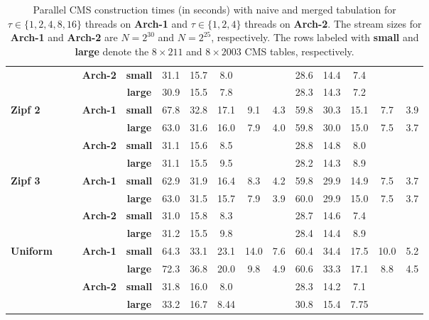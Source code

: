 \documentclass[10pt, conference, compsocconf]{IEEEtran}
\begin{document}
\begin{table}[htbp]
{\begin{tabular}{ccccc||ccccc|ccccc}
&&&\multirow{2}{*}{\textbf{Arch-2}} & \textbf{small}  & 31.1    & 15.7   & 8.0   &        &       &  28.6    &  14.4   & 7.4   &        &       \\
&&&& \textbf{large} &  30.9      &   15.5     &      7.8 &        &       &     28.3    &     14.3    &     7.2   &        &   \\ \hline   
\multicolumn{1}{l}{\multirow{4}{*}{\textbf{Zipf 2}}}
&&&\multirow{2}{*}{\textbf{Arch-1}} & \textbf{small}  & 67.8    & 32.8   & 17.1   & 9.1   & 4.3   & 59.8    & 30.3    & 15.1   & 7.7   & 3.9   \\
&&&& \textbf{large} & 63.0    & 31.6   & 16.0   &  7.9 & 4.0   &  59.8 &	30.0&	15.0	& 7.5	& 3.7 \\ \cline{2-15}

&&&\multirow{2}{*}{\textbf{Arch-2}} & \textbf{small}  & 31.1    & 15.6   & 8.5   &        &       &  28.8    &  14.8   & 8.0   &        &       \\
&&&& \textbf{large} &  31.1      &   15.5     &   9.5 &        &       &     28.2    &     14.3    &     8.9   &        &   \\ \hline
\multicolumn{1}{l}{\multirow{4}{*}{\textbf{Zipf 3}}}
&&&\multirow{2}{*}{\textbf{Arch-1}} & \textbf{small}  & 62.9    & 31.9   & 16.4   & 8.3   & 4.2   & 59.8    & 29.9    & 14.9   & 7.5   & 3.7   \\
&&&& \textbf{large} & 63.0    & 31.5   & 15.7   &  7.9 & 3.9   &  60.0 &	29.9&	15.0	& 7.5	& 3.7 \\ \cline{2-15}

&&&\multirow{2}{*}{\textbf{Arch-2}} & \textbf{small}  & 31.0    & 15.8   & 8.3   &        &       &  28.7    &  14.6   & 7.4   &        &       \\
&&&& \textbf{large} &  31.2      &   15.5     &   9.8 &        &       &    28.4    &     14.4    &     8.9   &        &   \\ \hline    
\multicolumn{1}{l}{\multirow{4}{*}{\textbf{Uniform}}}
&&&\multirow{2}{*}{\textbf{Arch-1}} & \textbf{small}  & 64.3    & 33.1   & 23.1   & 14.0   & 7.6   & 60.4    & 34.4    & 17.5   & 10.0   & 5.2   \\
&&&& \textbf{large} & 72.3    & 36.8   & 20.0   &   9.8 & 4.9   &  60.6 &	33.3 &	17.1	& 8.8	& 4.5 \\ \cline{2-15}

&&&\multirow{2}{*}{\textbf{Arch-2}} & \textbf{small}  & 31.8    & 16.0   & 8.0   &        &       &  28.3    &  14.2   & 7.1   &        &       \\
&&&& \textbf{large} &  33.2      &   16.7     &       8.44 &        &       &     30.8    &     15.4    &     7.75   &        &   \\ %
\end{tabular}
}
\caption{Parallel CMS construction times (in seconds) with naive and merged tabulation for $\tau \in \{1, 2, 4, 8, 16\}$ threads on \textbf{Arch-1} and  $\tau \in \{1, 2, 4\}$ threads on \textbf{Arch-2}. The stream sizes for \textbf{Arch-1} and \textbf{Arch-2} are $N = 2^{30}$ and $N = 2^{25}$, respectively. The rows labeled with {\bf small} and {\bf large} denote the $8 \times 211$ and $8 \times 2003$ CMS tables, respectively. } \label{tbl:mergedtbl}


\end{table}
\end{document}

